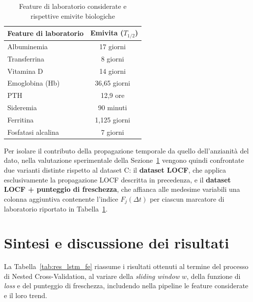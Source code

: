 \documentclass[a4paper,12pt]{report}
\begin{document}
\begin{table}[htbp]
    \centering
    \caption{Feature di laboratorio considerate e rispettive emivite biologiche}
    \label{tab:emivite}
    \begin{tabular}{lc}
        \toprule
        \textbf{Feature di laboratorio} & \textbf{Emivita ($T_{1/2}$)} \\
        \midrule
        Albuminemia & 17 giorni~\cite{10.1172/JCI102789} \\
        Transferrina & 8 giorni~\cite{PUPIM2013137} \\
        Vitamina D & 14 giorni~\cite{VITAMINDHL2023} \\
        Emoglobina (Hb) & 36,65 giorni~\cite{PPR:PPR204454, Wu31122025} \\
        PTH & 12,9 ore~\cite{Inoue1987StudiesOT} \\
        Sideremia & 90 minuti~\cite{SERUMIRONHL1985} \\
        Ferritina & 1,125 giorni~\cite{WORWOOD1982827} \\
        Fosfatasi alcalina & 7 giorni~\cite{Lowe2026} \\
        \bottomrule
    \end{tabular}
\end{table}

Per isolare il contributo della propagazione temporale da quello dell'anzianità del dato, nella valutazione sperimentale della Sezione~\ref{sec:results_analysis} vengono quindi confrontate due varianti distinte rispetto al dataset C: il \textbf{dataset LOCF}, che applica esclusivamente la propagazione LOCF descritta in precedenza, e il \textbf{dataset LOCF + punteggio di freschezza}, che affianca alle medesime variabili una colonna aggiuntiva contenente l'indice \(F_j(\Delta t)\) per ciascun marcatore di laboratorio riportato in Tabella~\ref{tab:emivite}.

\section{Sintesi e discussione dei risultati}
\label{sec:results_analysis}

La Tabella~\ref{tab:res_lstm_fe} riassume i risultati ottenuti al termine del processo di Nested Cross-Validation, al variare della \textit{sliding window} \(w\), della funzione di \textit{loss} e del punteggio di freschezza, includendo nella pipeline le feature considerate e il loro trend. 

\begingroup
\small
\setlength{\LTcapwidth}{\textwidth}
\end{document}
